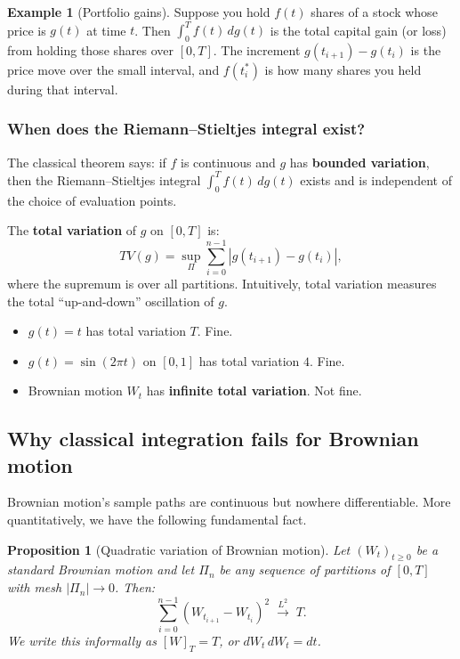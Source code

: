 \documentclass[11pt,a4paper]{article}
\theoremstyle{definition}
\newtheorem{example}{Example}[section]
\theoremstyle{plain}
\newtheorem{proposition}{Proposition}[section]
\theoremstyle{remark}
\newcommand{\abs}[1]{\left|#1\right|}
\begin{document}
\begin{example}[Portfolio gains]
Suppose you hold $f(t)$ shares of a stock whose price is $g(t)$ at time $t$. Then $\int_0^T f(t)\,dg(t)$ is the total capital gain (or loss) from holding those shares over $[0,T]$. The increment $g(t_{i+1}) - g(t_i)$ is the price move over the small interval, and $f(t_i^*)$ is how many shares you held during that interval.
\end{example}

\subsubsection*{When does the Riemann--Stieltjes integral exist?}

The classical theorem says: if $f$ is continuous and $g$ has \textbf{bounded variation}, then the Riemann--Stieltjes integral $\int_0^T f(t)\,dg(t)$ exists and is independent of the choice of evaluation points.

The \textbf{total variation} of $g$ on $[0,T]$ is:
\[
  TV(g) = \sup_\Pi \sum_{i=0}^{n-1} \abs{g(t_{i+1}) - g(t_i)},
\]
where the supremum is over all partitions. Intuitively, total variation measures the total ``up-and-down'' oscillation of $g$.

\begin{itemize}
  \item $g(t) = t$ has total variation $T$. Fine.
  \item $g(t) = \sin(2\pi t)$ on $[0, 1]$ has total variation $4$. Fine.
  \item Brownian motion $W_t$ has \textbf{infinite total variation}. Not fine.
\end{itemize}

\subsection{Why classical integration fails for Brownian motion}
\label{sec:classical-fails}

Brownian motion's sample paths are continuous but nowhere differentiable. More quantitatively, we have the following fundamental fact.

\begin{proposition}[Quadratic variation of Brownian motion]
\label{prop:qv}
Let $(W_t)_{t \geq 0}$ be a standard Brownian motion and let $\Pi_n$ be any sequence of partitions of $[0,T]$ with mesh $\abs{\Pi_n} \to 0$. Then:
\[
  \sum_{i=0}^{n-1} (W_{t_{i+1}} - W_{t_i})^2 \;\xrightarrow{L^2}\; T.
\]
We write this informally as $[W]_T = T$, or $dW_t\,dW_t = dt$.
\end{proposition}
\end{document}
